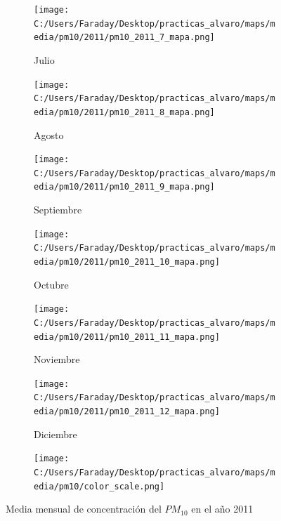 \documentclass[12pt]{article}
\begin{document}
\begin{figure}[H]
\begin{subfigure}[H]{0.15\textwidth}
\texttt{[image: C:/Users/Faraday/Desktop/practicas\_alvaro/maps/media/pm10/2011/pm10\_2011\_7\_mapa.png]}
\captionsetup{labelformat=empty}
\caption{Julio}
\label{fig:map-pm10-2011-7}
\end{subfigure}
%
\begin{subfigure}[H]{0.15\textwidth}
\texttt{[image: C:/Users/Faraday/Desktop/practicas\_alvaro/maps/media/pm10/2011/pm10\_2011\_8\_mapa.png]}
\captionsetup{labelformat=empty}
\caption{Agosto}
\label{fig:map-pm10-2011-8}
\end{subfigure}
%
\begin{subfigure}[H]{0.15\textwidth}
\texttt{[image: C:/Users/Faraday/Desktop/practicas\_alvaro/maps/media/pm10/2011/pm10\_2011\_9\_mapa.png]}
\captionsetup{labelformat=empty}
\caption{Septiembre}
\label{fig:map-pm10-2011-9}
\end{subfigure}
%
\begin{subfigure}[H]{0.15\textwidth}
\texttt{[image: C:/Users/Faraday/Desktop/practicas\_alvaro/maps/media/pm10/2011/pm10\_2011\_10\_mapa.png]}
\captionsetup{labelformat=empty}
\caption{Octubre}
\label{fig:map-pm10-2011-10}
\end{subfigure}
%
\begin{subfigure}[H]{0.15\textwidth}
\texttt{[image: C:/Users/Faraday/Desktop/practicas\_alvaro/maps/media/pm10/2011/pm10\_2011\_11\_mapa.png]}
\captionsetup{labelformat=empty}
\caption{Noviembre}
\label{fig:map-pm10-2011-11}
\end{subfigure}
%
\begin{subfigure}[H]{0.15\textwidth}
\texttt{[image: C:/Users/Faraday/Desktop/practicas\_alvaro/maps/media/pm10/2011/pm10\_2011\_12\_mapa.png]}
\captionsetup{labelformat=empty}
\caption{Diciembre}
\label{fig:map-pm10-2011-12}
\end{subfigure}

\begin{subfigure}[H]{0.45\textwidth}
\texttt{[image: C:/Users/Faraday/Desktop/practicas\_alvaro/maps/media/pm10/color\_scale.png]}
\captionsetup{labelformat=empty}
\caption{}
\end{subfigure}

\vspace*{-7mm}
\caption{Media mensual de concentración del $PM_{10}$ en el año 2011}
\label{fig:map-pm10-2011}
\end{figure}
\end{document}
